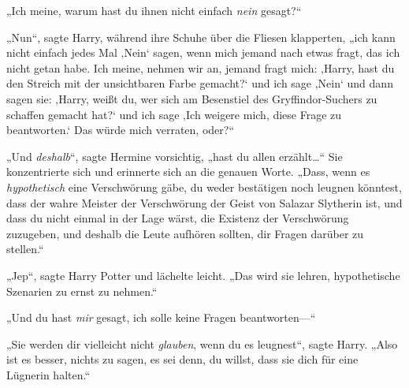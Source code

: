 „Ich meine, warum hast du ihnen nicht einfach \emph{nein} gesagt?“

„Nun“, sagte Harry, während ihre Schuhe über die Fliesen klapperten, „ich kann nicht einfach jedes Mal ‚Nein‘ sagen, wenn mich jemand nach etwas fragt, das ich nicht getan habe. Ich meine, nehmen wir an, jemand fragt mich: ‚Harry, hast du den Streich mit der unsichtbaren Farbe gemacht?‘ und ich sage ‚Nein‘ und dann sagen sie: ‚Harry, weißt du, wer sich am Besenstiel des Gryffindor-Suchers zu schaffen gemacht hat?‘ und ich sage ‚Ich weigere mich, diese Frage zu beantworten.‘ Das würde mich verraten, oder?“

„Und \emph{deshalb}“, sagte Hermine vorsichtig, „hast du allen erzählt…“ Sie konzentrierte sich und erinnerte sich an die genauen Worte. „Dass, wenn es \emph{hypothetisch} eine Verschwörung gäbe, du weder bestätigen noch leugnen könntest, dass der wahre Meister der Verschwörung der Geist von Salazar Slytherin ist, und dass du nicht einmal in der Lage wärst, die Existenz der Verschwörung zuzugeben, und deshalb die Leute aufhören sollten, dir Fragen darüber zu stellen.“

„Jep“, sagte Harry Potter und lächelte leicht. „Das wird sie lehren, hypothetische Szenarien zu ernst zu nehmen.“

„Und du hast \emph{mir} gesagt, ich solle keine Fragen beantworten—“

„Sie werden dir vielleicht nicht \emph{glauben}, wenn du es leugnest“, sagte Harry. „Also ist es besser, nichts zu sagen, es sei denn, du willst, dass sie dich für eine Lügnerin halten.“

